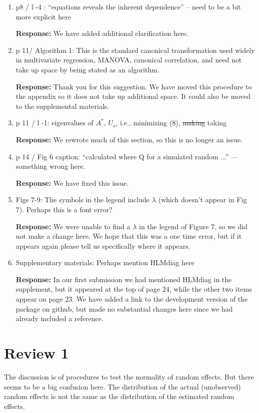 \documentclass[11pt]{article}
\begin{document}
\begin{enumerate}
\item p8 / l -4 : ``equations reveals the inherent dependence'' -- need to be a bit more explicit here

\textbf{Response:} We have added additional clarification here.

\item p 11/ Algorithm 1: This is the standard canonical transformation used widely in multivariate regression, MANOVA, canonical correlation, and need not take up space by being stated as an algorithm.

\textbf{Response:} Thank you for this suggestion. We have moved this procedure to the appendix so it does not take up additional space. It could also be moved to the supplemental materials.

\item p 11 / l -1: eigenvalues of $A^*$, $U_s$, i.e., minimizing (8), \sout{making} taking

\textbf{Response:} We rewrote much of this section, so this is no longer an issue.

\item p 14 / Fig 6 caption: ``calculated where Q for a simulated random ...'' --- something wrong
here.

\textbf{Response:} We have fixed this issue.

\item Figs 7-9: The symbols in the legend include $\lambda$ (which doesn't appear in Fig 7). Perhaps this is a font error?

\textbf{Response:} We were unable to find a $\lambda$ in the legend of Figure 7,  so we did not make a change here. We hope that this was a one time error, but if it appears again please tell us specifically where it appears.

\item Supplementary materials: Perhaps mention HLMdiag here

\textbf{Response:} In our first submission we had mentioned HLMdiag in the supplement, but it appeared at the top of page 24, while the other two items appear on page 23. We have added a link to the development version of the package on github, but made no substantial changes here since we had already included a reference.

\end{enumerate}

\section*{Review 1}
The discussion is of procedures to test the normality of random effects.  But there seems to be a big confusion here.  The distribution of the actual (unobserved) random effects is not the same as the distribution of the estimated random effects.
\end{document}
